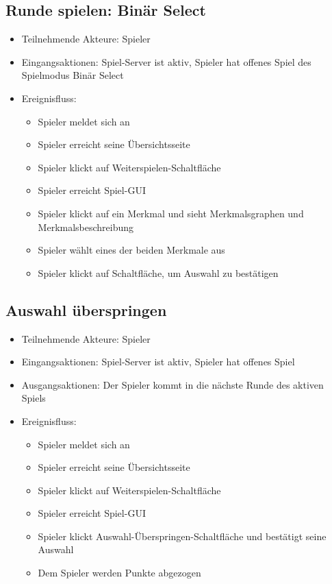 \documentclass[a4paper]{scrreprt}
\begin{document}
	\subsection{Runde spielen: Binär Select}
	\begin{itemize}
		\item Teilnehmende Akteure: \Gls{Spieler}
		\item Eingangsaktionen: \Gls{Spiel-Server} ist aktiv, \Gls{Spieler} hat offenes \Gls{Spiel} des \Gls{Spielmodus} Binär Select
		\item Ereignisfluss:
		\begin{itemize}
			\item \Gls{Spieler} meldet sich an
			\item \Gls{Spieler} erreicht seine Übersichtsseite
			\item \Gls{Spieler} klickt auf Weiterspielen-Schaltfläche
			\item \Gls{Spieler} erreicht Spiel-GUI
			\item \Gls{Spieler} klickt auf ein Merkmal und sieht Merkmalsgraphen und Merkmalsbeschreibung
			\item \Gls{Spieler} wählt eines der beiden Merkmale aus
			\item \Gls{Spieler} klickt auf Schaltfläche, um Auswahl zu bestätigen
		\end{itemize}
	\end{itemize}

	\subsection{Auswahl überspringen}
	\begin{itemize}
		\item Teilnehmende Akteure: \Gls{Spieler}
		\item Eingangsaktionen: \Gls{Spiel-Server} ist aktiv, \Gls{Spieler} hat offenes Spiel
        \item Ausgangsaktionen: Der \Gls{Spieler} kommt in die nächste Runde des aktiven Spiels
		\item Ereignisfluss:
		\begin{itemize}
			\item \Gls{Spieler} meldet sich an
			\item \Gls{Spieler} erreicht seine Übersichtsseite
			\item \Gls{Spieler} klickt auf Weiterspielen-Schaltfläche
			\item \Gls{Spieler} erreicht Spiel-GUI
			\item \Gls{Spieler} klickt Auswahl-Überspringen-Schaltfläche und bestätigt seine Auswahl
            \item Dem \Gls{Spieler} werden Punkte abgezogen
		\end{itemize}
	\end{itemize}
     
\end{document}
